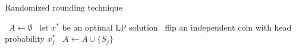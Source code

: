 \begin{algorithm}
    \caption{Randomized rounding technique}\label{alg:rand_round_sc}
    \begin{algorithmic}%
        \State~$A \gets \emptyset$
        \State~let $x^*$ be an optimal LP solution
                \State~flip an independent coin with head probability $x_j^*$
                    \State~$A \gets A \cup \{ S_j \}$
                \EndIf
            \EndFor
        \EndFor
    \end{algorithmic}
\end{algorithm}